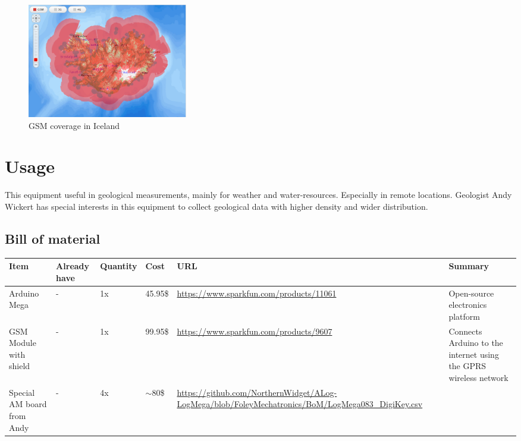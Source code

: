 \documentclass[12pt,a4paper,titlepage]{article}
\begin{document}
\begin{figure}
\centering
\includegraphics[height=50mm]{graphics/GSM_Coverage.PNG}
\caption{GSM coverage in Iceland\label{fig:GSM-Coverage} \cite{vodafone}}
\end{figure}

\section{Usage} 
 This equipment useful in geological measurements, mainly for weather and water-resources. Especially in remote locations. 
 Geologist Andy Wickert has special interests in this equipment to collect geological data with higher density and wider distribution. 
 


\subsection{Bill of material} %
\begin{center}
    \begin{tabular}{ | p{1.5cm} | p{1.4cm} | p{1.5cm} | l | p{5.5cm} | p{5cm} |}
    \hline
    Item & Already have & Quantity & Cost & URL & Summary \\ \hline
    
    Arduino Mega & - & 1x & 45.95\$ & \url{https://www.sparkfun.com/products/11061} & Open-source electronics platform \\ \hline
    
    GSM Module with shield & - & 1x & 99.95\$ & \url{https://www.sparkfun.com/products/9607} & Connects Arduino to the internet using the GPRS wireless network \\ \hline
    
	Special AM board from Andy & - & 4x & $\sim$80\$ & \url{https://github.com/NorthernWidget/ALog-LogMega/blob/FoleyMechatronics/BoM/LogMega083_DigiKey.csv} &  \\ \hline
    \end{tabular}
\end{center}
 



\end{document}
